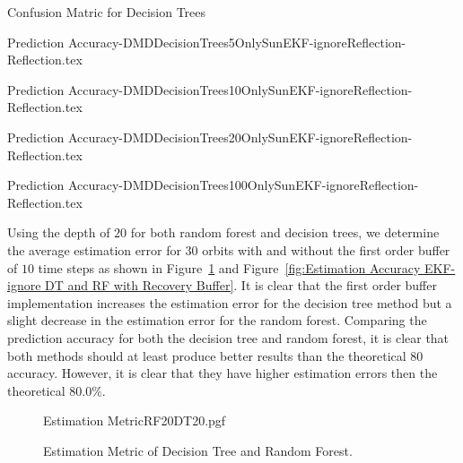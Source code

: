 \documentclass[letterpaper, 10 pt, conference]{ieeeconf}  %
\begin{document}
\begin{table*}[h!tb]
	\caption{Confusion Matric for Decision Trees} 
	\label{Table: Prediction Accuracy-DMDDecisionTreesOnlySunEKF-ignoreReflection-Reflection} 
	\centering
	\begin{minipage}[c]{0.2\textwidth}
		{Prediction Accuracy-DMDDecisionTrees5OnlySunEKF-ignoreReflection-Reflection.tex}
	\end{minipage}
	\begin{minipage}[c]{0.2\textwidth}
		{Prediction Accuracy-DMDDecisionTrees10OnlySunEKF-ignoreReflection-Reflection.tex}
	\end{minipage}
	\begin{minipage}[c]{0.2\textwidth}
		{Prediction Accuracy-DMDDecisionTrees20OnlySunEKF-ignoreReflection-Reflection.tex}
	\end{minipage}
	\begin{minipage}[c]{0.2\textwidth}
		{Prediction Accuracy-DMDDecisionTrees100OnlySunEKF-ignoreReflection-Reflection.tex}
	\end{minipage}
\end{table*}

Using the depth of $20$ for both random forest and decision trees, we determine the average estimation error for $30$ orbits with and without the first order buffer of $10$ time steps as shown in Figure~\ref{fig:Estimation Accuracy EKF-ignore DT and RF} and Figure~\ref{fig:Estimation Accuracy EKF-ignore DT and RF with Recovery Buffer}. It is clear that the first order buffer implementation increases the estimation error for the decision tree method but a slight decrease in the estimation error for the random forest. Comparing the prediction accuracy for both the decision tree and random forest, it is clear that both methods should at least produce better results than the theoretical $80$ accuracy. However, it is clear that they have higher estimation errors then the theoretical $80.0\%$. 

\begin{figure}[!htb]
	\begin{center}
		{Estimation MetricRF20DT20.pgf}
	\end{center}
	\caption[Estimation Metric of Decision Tree and Random Forest]{Estimation Metric of Decision Tree and Random Forest.}
	\label{fig:Estimation Accuracy EKF-ignore DT and RF}
\end{figure}
\end{document}
